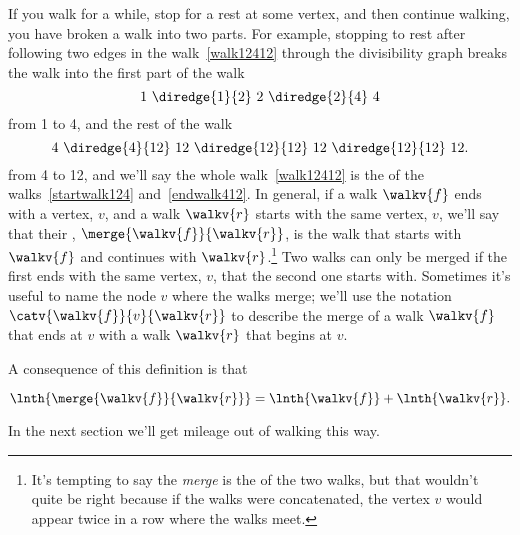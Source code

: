 If you walk for a while, stop for a rest at some vertex, and then
continue walking, you have broken a walk into two parts.  For example,
stopping to rest after following two edges in the walk~\eqref{walk12412}
through the divisibility graph breaks the walk into the first part of the walk
\begin{equation}\label{startwalk124}
1\ \diredge{1}{2}\  2\  \diredge{2}{4}\  4
\end{equation}
from 1 to 4, and the rest of the walk
\begin{equation}\label{endwalk412}
4\ \diredge{4}{12}\  12\  \diredge{12}{12}\  12\ \diredge{12}{12}\  12.
\end{equation}
from 4 to 12, and we'll say the whole walk~\eqref{walk12412} is the
 of the walks~\eqref{startwalk124} and~\eqref{endwalk412}.
In general, if a walk $\walkv{f}$ ends with a vertex, $v$, and a walk
$\walkv{r}$ starts with the same vertex, $v$, we'll say that their
, $\merge{\walkv{f}}{\walkv{r}}$, is the walk that starts
with $\walkv{f}$ and continues with $\walkv{r}$.\footnote{It's
  tempting to say the \emph{merge} is the  of the
  two walks, but that wouldn't quite be right because if the walks
  were concatenated, the vertex $v$ would appear twice in a row where
  the walks meet.}  Two walks can only be merged if the first ends
with the same vertex, $v$, that the second one starts with.  Sometimes
it's useful to name the node $v$ where the walks merge; we'll use the
notation $\catv{\walkv{f}}{v}{\walkv{r}}$ to describe the merge of a
walk $\walkv{f}$ that ends at $v$ with a walk $\walkv{r}$ that begins
at $v$.

\iffalse
 Here's a precise definition:
\begin{definition}
If a walk $\walkv{f}$ ends at a vertex $v$ and a walk $\walkv{r}$
begins at the same vertex $v$, then the \term{$v$-merge} of
$\walkv{f}$ with $\walkv{r}$, written,
\[
\catv{\walkv{f}}{v}{\walkv{r}},
\]
is the walk whose vertex sequence is the vertex sequence of
$\walkv{f}$ concatenated with the vertex sequence of $\walkv{r}$
without its initial $v$.  That is, if
\begin{align*}
\walkv{r} & = v\,\vec{\alpha},
\end{align*}
for some finite sequence $\vec{\alpha}$ of vertices,
then
\[
\catv{\walkv{f}}{v}{\walkv{r}} \eqdef  \walkv{f}\alpha.
\]
\end{definition}
\fi

A consequence of this definition is that
\begin{lemma}\label{sumoflengths}
\[
\lnth{\merge{\walkv{f}}{\walkv{r}}} = \lnth{\walkv{f}} + \lnth{\walkv{r}}.
\]
\end{lemma}
In the next section we'll get mileage out of walking this way.

